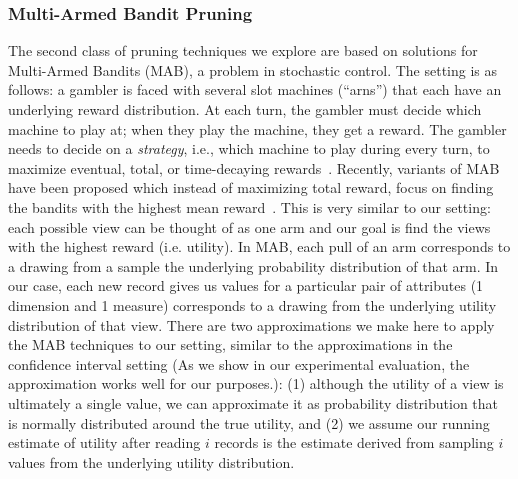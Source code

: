 \subsubsection{Multi-Armed Bandit Pruning}
\label{sec:multi_armed_bandit}
The second class of pruning techniques we explore
are based on solutions for Multi-Armed Bandits (MAB), a problem 
in stochastic control. 
The setting is as follows: 
a gambler is faced with several slot
machines (``arns'') that each have an underlying reward
distribution. 
At each turn, the gambler must decide which machine
to play at; when they play the machine, they get a reward.
The gambler needs to decide on a {\em strategy}, i.e.,
which machine to play during every turn, to maximize
eventual, total, or time-decaying rewards~\cite{bandits}.
Recently, variants of MAB have been proposed 
which instead of maximizing total reward, 
focus on finding the bandits with the highest mean reward~\cite{BubeckWV13}.
This is very similar to our setting: each possible view can be thought of as
one arm and our goal is find the views with the highest reward (i.e.
utility).
In MAB, each pull of an arm corresponds to a drawing from a sample
the underlying probability distribution of that arm.
In our case, each new record gives us values
for a particular pair of attributes (1 dimension and
1 measure) corresponds to a drawing 
from the underlying utility distribution of that view.
There are two approximations we make here to apply the MAB techniques
to our setting, 
similar to the approximations in the confidence interval setting
(As we show in our experimental evaluation,
the approximation works well
for our purposes.): 
(1) although the utility of a
view is ultimately a single value, we can approximate it as probability
distribution that is normally distributed around the true utility, and 
(2) we assume our running estimate of utility after reading $i$
records is the estimate derived from sampling $i$ values from
the underlying utility distribution.

